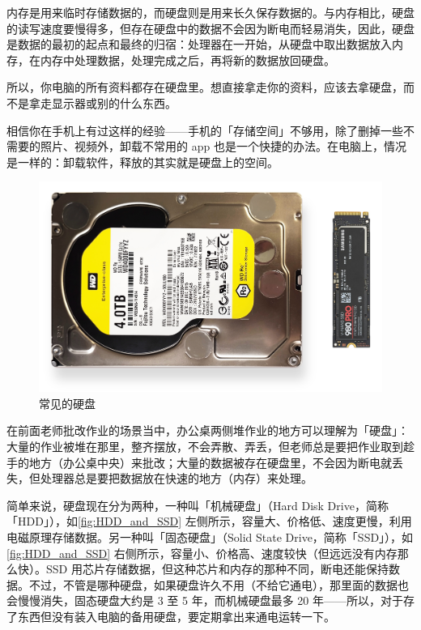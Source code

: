 内存是用来临时存储数据的，而硬盘则是用来长久保存数据的。与内存相比，硬盘的读写速度要慢得多，但存在硬盘中的数据不会因为断电而轻易消失，因此，硬盘是数据的最初的起点和最终的归宿：处理器在一开始，从硬盘中取出数据放入内存，在内存中处理数据，处理完成之后，再将新的数据放回硬盘。

\begin{note}
  所以，你电脑的所有资料都存在硬盘里。想直接拿走你的资料，应该去拿硬盘，而不是拿走显示器或别的什么东西。
\end{note}

相信你在手机上有过这样的经验——手机的「存储空间」不够用，除了删掉一些不需要的照片、视频外，卸载不常用的 app 也是一个快捷的办法。在电脑上，情况是一样的：卸载软件，释放的其实就是硬盘上的空间。

\begin{figure}[htb!]
  \centering
  \includegraphics[width=.7\textwidth]{assets/basic/HDD_and_SSD.png}
  \caption{常见的硬盘}
  \label{fig:HDD_and_SSD}
\end{figure}

在前面老师批改作业的场景当中，办公桌两侧堆作业的地方可以理解为「硬盘」：大量的作业被堆在那里，整齐摆放，不会弄散、弄丢，但老师总是要把作业取到趁手的地方（办公桌中央）来批改；大量的数据被存在硬盘里，不会因为断电就丢失，但处理器总是要把数据放在快速的地方（内存）来处理。

简单来说，硬盘现在分为两种，一种叫「机械硬盘」（Hard Disk Drive，简称「HDD」），如\autoref{fig:HDD_and_SSD} 左侧所示，容量大、价格低、速度更慢，利用电磁原理存储数据。另一种叫「固态硬盘」（Solid State Drive，简称「SSD」），如\autoref{fig:HDD_and_SSD} 右侧所示，容量小、价格高、速度较快（但远远没有内存那么快）。SSD 用芯片存储数据，但这种芯片和内存的那种不同，断电还能保持数据。不过，不管是哪种硬盘，如果硬盘许久不用（不给它通电），那里面的数据也会慢慢消失，固态硬盘大约是 3 至 5 年，而机械硬盘最多 20 年——所以，对于存了东西但没有装入电脑的备用硬盘，要定期拿出来通电运转一下。

